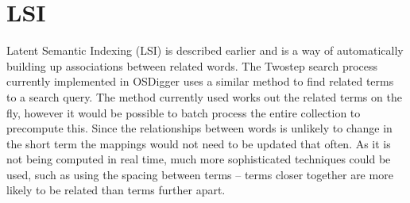 \section{LSI}
Latent Semantic Indexing (LSI) is described earlier and is a way of automatically building up associations between related words.  The Twostep search process currently implemented in OSDigger uses a similar method to find related terms to a search query.  The method currently used works out the related terms on the fly, however it would be possible to batch process the entire collection to precompute this.  Since the relationships between words is unlikely to change in the short term the mappings would not need to be updated that often.  As it is not being computed in real time, much more sophisticated techniques could be used, such as using the spacing between terms -- terms closer together are more likely to be related than terms further apart.

